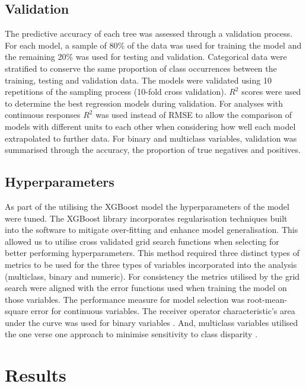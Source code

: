 \documentclass[review,12pt,authoryear]{elsarticle}
\begin{document}
\begin{linenumbers}
\subsection{Validation}

The predictive accuracy of each tree was assessed through a validation process. For each model, a sample of 80\% of the data was used for training the model and the remaining 20\% was used for testing and validation. Categorical data were stratified to conserve the same proportion of class occurrences between the training, testing and validation data. The models were validated using 10 repetitions of the sampling process (10-fold cross validation). $R^2$ scores were used to determine the best regression models during validation. For analyses with continuous responses $R^2$ was used instead of RMSE to allow the comparison of models with different units to each other when considering how well each model extrapolated to further data. For binary and multiclass variables, validation was summarised through the accuracy, the proportion of true negatives and positives.

\subsection{Hyperparameters}

As part of the utilising the XGBoost model the hyperparameters of the model were tuned. The XGBoost library incorporates regularisation techniques built into the software to mitigate over-fitting and enhance model generalisation. This allowed us to utilise cross validated grid search functions when selecting for better performing hyperparameters. This method required three distinct types of metrics to be used for the three types of variables incorporated into the analysis (multiclass, binary and numeric). For consistency the metrics utilised by the grid search were aligned with the error functions used when training the model on those variables. The performance measure for model selection was root-mean-square error for continuous variables. The receiver operator characteristic's area under the curve was used for binary variables \citep{hanleyMeaningUseArea1982}. And, multiclass variables utilised the one verse one approach to minimise sensitivity to class disparity \citep{ferriExperimentalComparisonPerformance2009,handSimpleGeneralisationArea2001}.

\section{Results}


\end{linenumbers}
\end{document}
